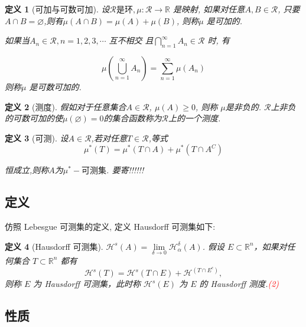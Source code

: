 \documentclass[hyperref,a4paper,UTF8]{ctexart}
\newtheorem{definition}{定义}[section]
\begin{document}
\begin{definition}[可加与可数可加]

  设$\mathscr{R} 是环,\mu : \mathscr{R} \rightarrow \mathbb{R}$ 是映射,
  如果对任意$A,B \in \mathscr{R}$,
  只要$A \cap B = \varnothing $,则有$\mu(A\cap B) = \mu(A) + \mu(B)$,
  则称$\mu$ 是可加的. 

  如果当$A_n \in \mathscr{R}, n = 1,2,3,\cdots$ 互不相交
  且$ \bigcap\limits_{n=1}^{\infty} A_n \in \mathscr{R}$ 时,
  有 
  

  \[
    \mu\left(\bigcup_{n=1}^{\infty} A_{n}\right) = \sum_{n=1}^{\infty} \mu\left(A_{n}\right)
  \]
  则称$\mu$ 是可数可加的.


\end{definition}

\begin{definition}[测度]

  假如对于任意集合$A \in \mathscr{R}$, $\mu(A) \geq 0$, 则称 $\mu $是非负的. 
  $\mathscr{R}$上非负的可数可加的使$\mu(\varnothing) = 0$的集合函数称为$\mathscr{R}$上的一个测度. 

\end{definition}

\begin{definition}[可测]

  设$A\in\mathscr{R}$,若对任意$T \in \mathscr{R}$,等式
  \[
    \mu^*(T) = \mu^*(T \cap A) + \mu^*(T \cap A^C) 
  \]

  恒成立,则称$A$为$\mu^*-\text{可测集}$.
  要寄!!!!!!

\end{definition}

\subsection{定义}

仿照 Lebesgue 可测集的定义, 定义 Hausdorff 可测集如下:

\begin{definition}[Hausdorff 可测集]
  $ \mathcal{H}^s(A) = \lim\limits_{\delta \to 0} \mathcal{H}_\alpha^\delta(A)$.
  假设 \( E \subset \mathbb{R}^n \)，如果对任何集合 \( T \subset \mathbb{R}^n \) 都有
  \[ 
    \mathcal{H}^s(T) = \mathcal{H}^s(T \cap E) + \mathcal{H}^(T \cap E^c), 
  \]
  则称 \( E \) 为 Hausdorff 可测集，此时称 \( \mathcal{H}^s(E) \) 为 \( E \) 的 Hausdorff 测度.\textrm{\textcolor{red}{(2)}}
\end{definition}

\subsection{性质}
\end{document}
